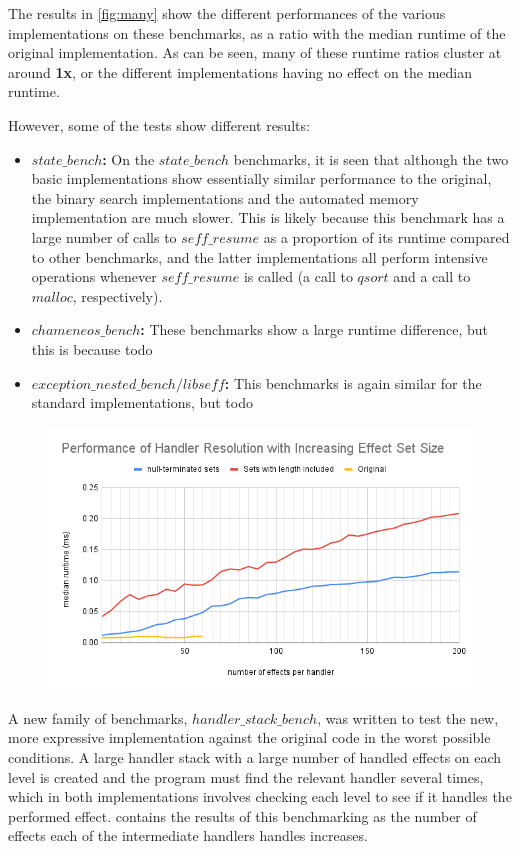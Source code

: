 \documentclass[logo,bsc,singlespacing,parskip,online]{infthesis}
\begin{document}
The results in \cref{fig:many} show the different performances of the various implementations on these benchmarks, as a ratio with the median runtime of the original implementation. As can be seen, many of these runtime ratios cluster at around \textbf{1x}, or the different implementations having no effect on the median runtime.

However, some of the tests show different results:
\begin{itemize}
    \item \textbf{$state\_bench$:} On the $state\_bench$ benchmarks, it is seen that although the two basic implementations show essentially similar performance to the original, the binary search implementations and the automated memory implementation are much slower. This is likely because this benchmark has a large number of calls to $seff\_resume$ as a proportion of its runtime compared to other benchmarks, and the latter implementations all perform intensive operations whenever $seff\_resume$ is called (a call to $qsort$ and a call to $malloc$, respectively).
    \item \textbf{$chameneos\_bench$:} These benchmarks show a large runtime difference, but this is because todo%
    \item \textbf{$exception\_nested\_bench/libseff$:} This benchmarks is again similar for the standard implementations, but todo%
\end{itemize}

\begin{figure}[ht]
    \centering
    \includegraphics[width=\linewidth]{width_parametrized_performance.png}
    \caption{}
    \label{fig:adjusted}
\end{figure}

A new family of benchmarks, $handler\_stack\_bench$, was written to test the new, more expressive implementation against the original code in the worst possible conditions. A large handler stack with a large number of handled effects on each level is created and the program must find the relevant handler several times, which in both implementations involves checking each level to see if it handles the performed effect.  contains the results of this benchmarking as the number of effects each of the intermediate handlers handles increases.
\end{document}
